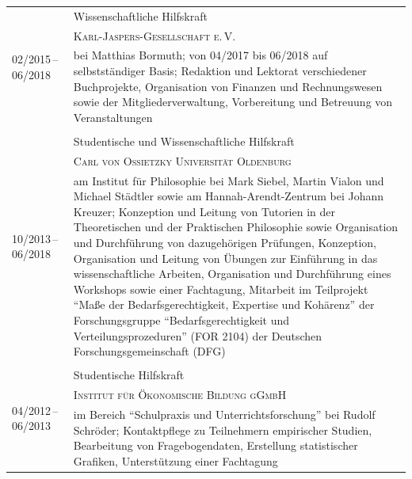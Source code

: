 \documentclass[a4paper,10pt]{article}
\begin{document}
\begin{longtable}{p{2.5cm}p{11cm}}
\\
\multirow{3}{2.5cm}{\footnotesize{02/2015\,--\,06/2018}} & Wissenschaftliche Hilfskraft\\
& \textsc{Karl-Jaspers-Gesellschaft e.\,V.}\\
& \footnotesize{bei Matthias Bormuth; von 04/2017 bis 06/2018 auf selbstständiger Basis; Redaktion und Lektorat verschiedener Buchprojekte, Organisation von Finanzen und Rechnungswesen sowie der Mitgliederverwaltung, Vorbereitung und Betreuung von Veranstaltungen}\\
\\
\multirow{3}{2.5cm}{\footnotesize{10/2013\,--\,06/2018}} & Studentische und Wissenschaftliche Hilfskraft\\
& \textsc{Carl von Ossietzky Universität Oldenburg}\\
& \footnotesize{am Institut für Philosophie bei Mark Siebel, Martin Vialon und Michael Städtler sowie am Hannah-Arendt-Zentrum bei Johann Kreuzer; Konzeption und Leitung von Tutorien in der Theoretischen und der Praktischen Philosophie sowie Organisation und Durchführung von dazugehörigen Prüfungen, Konzeption, Organisation und Leitung von Übungen zur Einführung in das wissenschaftliche Arbeiten, Organisation und Durchführung eines Workshops sowie einer Fachtagung, Mitarbeit im Teilprojekt \enquote{Maße der Bedarfsgerechtigkeit, Expertise und Kohärenz} der Forschungsgruppe \enquote{Bedarfsgerechtigkeit und Verteilungsprozeduren} (FOR 2104) der Deutschen Forschungsgemeinschaft (DFG)}\\
\\
\multirow{3}{2.5cm}{\footnotesize{04/2012\,--\,06/2013}} & Studentische Hilfskraft\\
& \textsc{Institut für Ökonomische Bildung gGmbH}\\
& \footnotesize{im Bereich \enquote{Schulpraxis und Unterrichtsforschung} bei Rudolf Schröder; Kontaktpflege zu Teilnehmern empirischer Studien, Bearbeitung von Fragebogendaten, Erstellung statistischer Grafiken, Unterstützung einer Fachtagung}\\
\end{longtable}


\clearpage
\end{document}
